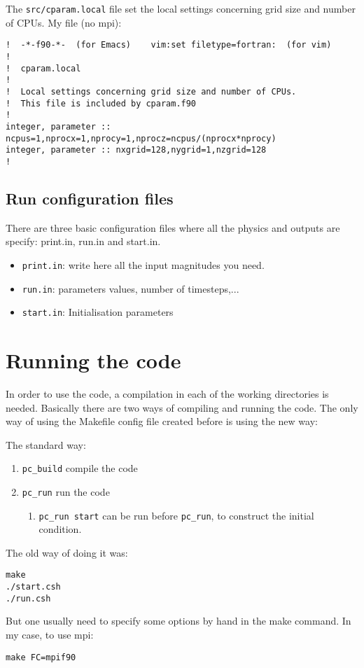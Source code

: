\documentclass[a4paper,12pt]{article}
\begin{document}
The \texttt{src/cparam.local} file set the local settings concerning grid size
and number of CPUs. My file (no mpi):
\begin{verbatim}
!  -*-f90-*-  (for Emacs)    vim:set filetype=fortran:  (for vim)
!
!  cparam.local
!
!  Local settings concerning grid size and number of CPUs.
!  This file is included by cparam.f90
!
integer, parameter :: ncpus=1,nprocx=1,nprocy=1,nprocz=ncpus/(nprocx*nprocy)
integer, parameter :: nxgrid=128,nygrid=1,nzgrid=128
!
\end{verbatim}

\subsection{Run configuration files}

There are three basic configuration files where all the physics and outputs are specify: print.in, run.in and start.in.
\begin{itemize}
 \item \verb|print.in|: write here all the input magnitudes you need.
  \item \verb|run.in|: parameters values, number of timesteps,...
  \item \verb|start.in|: Initialisation parameters
\end{itemize}



\section{Running the code}

In order to use the code, a compilation in each of the working directories is
needed. Basically there are two ways of compiling and running the code.
The only way of using the Makefile config file created before is using the new
way:

The standard way:
\begin{enumerate}
  \item \verb|pc_build| compile the code
  \item \verb|pc_run| run the code
    \begin{enumerate}
      \item \verb|pc_run start| can be run before \verb|pc_run|, to construct
        the initial condition.
    \end{enumerate}
\end{enumerate}

The old way of doing it was:
\begin{verbatim}
make
./start.csh
./run.csh
\end{verbatim}
But one usually need to specify some options by hand in the make command. In my
case, to use mpi:
\begin{verbatim}
make FC=mpif90
\end{verbatim}
    
\end{document}
